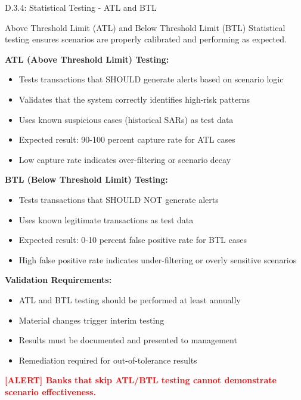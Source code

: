 \documentclass[11pt,a4paper]{beamer}
\newcommand{\redflag}[1]{\textcolor{red}{\textbf{[ALERT] #1}}}
\begin{document}
\begin{frame}{D.3.4: Statistical Testing - ATL and BTL}
	\begin{block}{Above Threshold Limit (ATL) and Below Threshold Limit (BTL)}
		Statistical testing ensures scenarios are properly calibrated and performing as expected.
	\end{block}
	\textbf{ATL (Above Threshold Limit) Testing:}
	\begin{itemize}
		\item Tests transactions that SHOULD generate alerts based on scenario logic
		\item Validates that the system correctly identifies high-risk patterns
		\item Uses known suspicious cases (historical SARs) as test data
		\item Expected result: 90-100 percent capture rate for ATL cases
		\item Low capture rate indicates over-filtering or scenario decay
	\end{itemize}
	\textbf{BTL (Below Threshold Limit) Testing:}
	\begin{itemize}
		\item Tests transactions that SHOULD NOT generate alerts
		\item Uses known legitimate transactions as test data
		\item Expected result: 0-10 percent false positive rate for BTL cases
		\item High false positive rate indicates under-filtering or overly sensitive scenarios
	\end{itemize}
	\textbf{Validation Requirements:}
	\begin{itemize}
		\item ATL and BTL testing should be performed at least annually
		\item Material changes trigger interim testing
		\item Results must be documented and presented to management
		\item Remediation required for out-of-tolerance results
	\end{itemize}
	\redflag{Banks that skip ATL/BTL testing cannot demonstrate scenario effectiveness.}
\end{frame}
\end{document}
